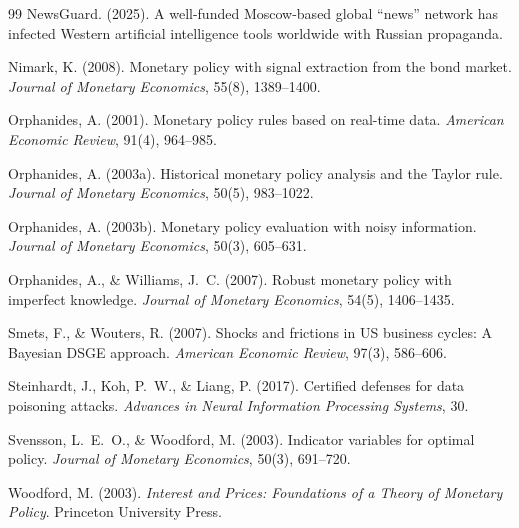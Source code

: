 \documentclass[12pt]{article}
\begin{document}
\begin{thebibliography}{99}
NewsGuard. (2025). A well-funded Moscow-based global ``news'' network has infected Western artificial intelligence tools worldwide with Russian propaganda.

Nimark, K. (2008). Monetary policy with signal extraction from the bond market. \emph{Journal of Monetary Economics}, 55(8), 1389--1400.

Orphanides, A. (2001). Monetary policy rules based on real-time data. \emph{American Economic Review}, 91(4), 964--985.

Orphanides, A. (2003a). Historical monetary policy analysis and the Taylor rule. \emph{Journal of Monetary Economics}, 50(5), 983--1022.

Orphanides, A. (2003b). Monetary policy evaluation with noisy information. \emph{Journal of Monetary Economics}, 50(3), 605--631.

Orphanides, A., \& Williams, J.\ C. (2007). Robust monetary policy with imperfect knowledge. \emph{Journal of Monetary Economics}, 54(5), 1406--1435.

Smets, F., \& Wouters, R. (2007). Shocks and frictions in US business cycles: A Bayesian DSGE approach. \emph{American Economic Review}, 97(3), 586--606.

Steinhardt, J., Koh, P.\ W., \& Liang, P. (2017). Certified defenses for data poisoning attacks. \emph{Advances in Neural Information Processing Systems}, 30.

Svensson, L.\ E.\ O., \& Woodford, M. (2003). Indicator variables for optimal policy. \emph{Journal of Monetary Economics}, 50(3), 691--720.

Woodford, M. (2003). \emph{Interest and Prices: Foundations of a Theory of Monetary Policy}. Princeton University Press.

\end{thebibliography}
\end{document}
